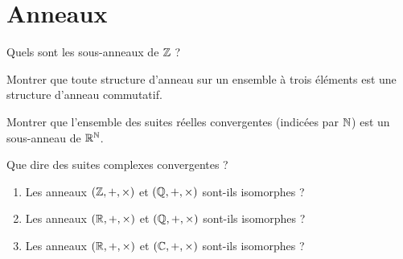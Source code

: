 \begin{corr}
\end{corr}

\section{Anneaux}

\begin{exo}
Quels sont les sous-anneaux de \(\mathbb{Z}\) ?
\end{exo}

\begin{corr}
\end{corr}

\begin{exo}
Montrer que toute structure d'anneau sur un ensemble à trois éléments est une structure d'anneau commutatif.
\end{exo}

\begin{corr}
\end{corr}

\begin{exo}
Montrer que l'ensemble des suites réelles convergentes (indicées par \(\mathbb{N}\)) est un sous-anneau de \(\mathbb{R}^{\mathbb{N}}\).

Que dire des suites complexes convergentes ?
\end{exo}

\begin{corr}
\end{corr}

\begin{exo}
\begin{enumerate}
\item Les anneaux \(\anneau{\Z}\) et \(\anneau{\Q}\) sont-ils isomorphes ? \\

\item Les anneaux \(\anneau{\R}\) et \(\anneau{\Q}\) sont-ils isomorphes ? \\

\item Les anneaux \(\anneau{\R}\) et \(\anneau{\C}\) sont-ils isomorphes ?
\end{enumerate}
\end{exo}

\begin{corr}
\end{corr}

